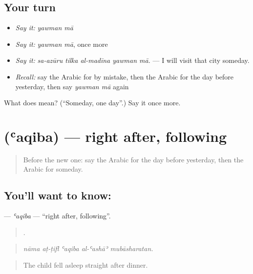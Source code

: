 \subsection*{Your turn}
\begin{itemize}
\raggedright
  \item \emph{Say it:} \emph{yawman mā}
  \item \emph{Say it:} \emph{yawman mā}, once more
  \item \emph{Say it:} \emph{sa-azūru tilka al-madīna yawman mā.} — I will visit that city someday.
  \item \emph{Recall:} say the Arabic for by mistake, then the Arabic for the day before yesterday, then say \emph{yawman mā} again
\end{itemize}

\begin{tcolorbox}[breakable,colback=teal!4,colframe=teal!35!black,title={Before you move on}]
What does   mean? (\textquotedblleft{}Someday, one day\textquotedblright{}.) Say it once more.
\end{tcolorbox}
\section[\texorpdfstring{\ar{عقب} (ʿaqiba)}{عقب (ʿaqiba)}]{ (ʿaqiba) — right after, following}

\label{lesson:AR-C349-aqiba}



\begin{quote}
Before the new one: say the Arabic for the day before yesterday, then the Arabic for someday.
\end{quote}

\subsection*{You'll want to know: }
\textbf{} — \emph{ʿaqiba} — \textquotedblleft{}right after, following\textquotedblright{}.

\begin{quote}
    .
\end{quote}

\begin{quote}
\emph{nāma aṭ-ṭifl ʿaqiba al-ʿashāʾ mubāsharatan.}
\end{quote}

\begin{quote}
The child fell asleep straight after dinner.
\end{quote}

